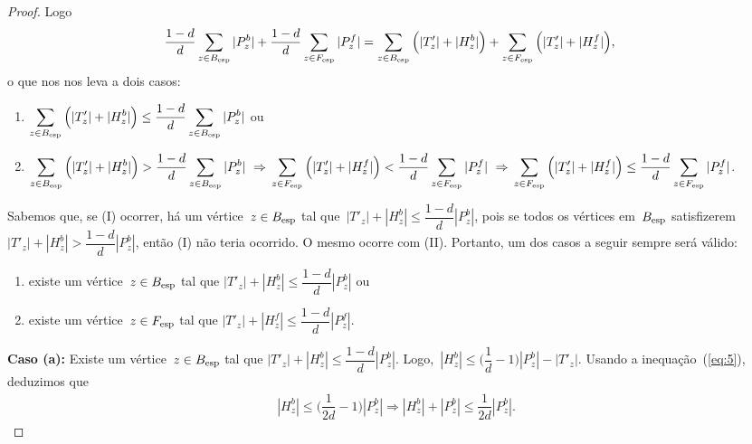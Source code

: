 \begin{proof}
			Logo
	\begin{align}
			\dfrac{1-d}{d}\displaystyle\sum_{z\in B_{\mathrm{esp}}}|P_z^b| &+ 
			\dfrac{1-d}{d}\displaystyle\sum_{z\in F_{\mathrm{esp}}}|P_z^f|
			= \displaystyle\sum_{z\in B_{\mathrm{esp}}}
			\Big(|T'_{z}|+|H_z^b|\Big) + 
			\displaystyle\sum_{z\in F_{\mathrm{esp}}}
			\Big(|T'_{z}|+|H_z^f|\Big),\nonumber
	\end{align}
	o que nos nos leva a dois casos:
	\begin{enumerate}[label=(\Roman*)]   %
		\item $\displaystyle\sum_{z\in B_{\mathrm{esp}}}
			\Big(|T'_{z}|+|H_z^b|\Big)\le
			\dfrac{1-d}{d}\displaystyle\sum_{z\in B_{\mathrm{esp}}}|P_z^b|$
			ou
		\item $\displaystyle\sum_{z\in B_{\mathrm{esp}}}
			\Big(|T'_{z}|+|H_z^b|\Big)>
			\dfrac{1-d}{d}\displaystyle\sum_{z\in B_{\mathrm{esp}}}|P_z^b|
			\ \Rightarrow \\
			\displaystyle\sum_{z\in F_{\mathrm{esp}}}
			\Big(|T'_{z}|+|H_z^f|\Big)<
			\dfrac{1-d}{d}\displaystyle\sum_{z\in F_{\mathrm{esp}}}|P_z^f|
			\ \Rightarrow \\
			\displaystyle\sum_{z\in F_{\mathrm{esp}}}
			\Big(|T'_{z}|+|H_z^f|\Big)\le
			\dfrac{1-d}{d}\displaystyle\sum_{z\in F_{\mathrm{esp}}}|P_z^f|$.
	\end{enumerate}

	Sabemos que, se (I) ocorrer, há um 
	vértice~${z\in B_{\mathrm{esp}}}$ tal que~${|T'_z|+|H^b_z|\le \dfrac{1-d}{d}|P^b_z|}$,
	pois se todos os vértices em~$B_{\mathrm{esp}}$ 
	satisfizerem~${|T'_z|+|H^b_z| > \dfrac{1-d}{d}|P^b_z|}$, então (I)
	não teria ocorrido.
	O mesmo ocorre com (II). 
	Portanto, um dos casos a seguir sempre será válido:

	\begin{enumerate}[label=(\alph*)]
		\item existe um vértice~$z\in B_{\mathrm{esp}}$ 
			tal que $|T'_{z}|+|H_z^b|\le
			\dfrac{1-d}{d}|P_z^b|$ ou
		\item existe um vértice~$z\in F_{\mathrm{esp}}$ 
			tal que $|T'_{z}|+|H_z^f|\le
			\dfrac{1-d}{d}|P_z^f|.$
	\end{enumerate}

	\bigskip
	\bigskip
	
	\textbf{Caso (a):}
		Existe um vértice~$z\in B_{\mathrm{esp}}$ 
		tal que ${|T'_{z}|+|H_z^b|\le
		\dfrac{1-d}{d}|P_z^b|}$. 
		Logo,~${|H^b_z|\le \Big(\dfrac{1}{d}-1\Big)|P^b_z|-|T'_z|}$.
		Usando a inequação~(\ref{eq:5}), deduzimos
		que
		\begin{align}
			|H^b_z|\le\Big(\dfrac{1}{2d}-1\Big)|P^b_z|
			\Rightarrow
			|H^b_z|+|P^b_z|\le\dfrac{1}{2d}|P^b_z|. \nonumber
		\end{align}


\end{proof}

